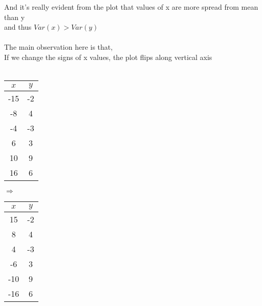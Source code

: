 \documentclass{article}
\begin{document}
And it's really evident from the plot that values of x are more spread from mean than y\\
and thus $Var(x)>Var(y)$\\\\
The main observation here is that,\\
If we change the signs of x values, the plot flips along vertical axis\\\\

\begin{tabular}{|c|c|}
  \hline
  {$x$} & {$y$} \\ \hline
  -15   & -2    \\ \hline
  -8    & 4     \\ \hline
  -4    & -3    \\ \hline
  6     & 3     \\ \hline
  10    & 9     \\ \hline
  16    & 6     \\ \hline
\end{tabular}
$\mathbf{\Longrightarrow}$ \begin{tabular}{|c|c|}
  \hline
  {$x$} & {$y$} \\ \hline
  15    & -2    \\ \hline
  8     & 4     \\ \hline
  4     & -3    \\ \hline
  -6    & 3     \\ \hline
  -10   & 9     \\ \hline
  -16   & 6     \\ \hline
\end{tabular}\\\\\\
\end{document}
